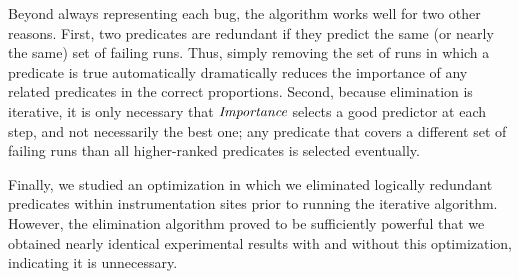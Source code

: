 Beyond always representing each bug, the algorithm works well for two
other reasons.  First, two predicates are redundant if they predict
the same (or nearly the same) set of failing runs.  Thus, simply
removing the set of runs in which a predicate is true automatically
dramatically reduces the importance of any related predicates in the
correct proportions. Second, because elimination is iterative, it is
only necessary that $\textit{Importance}$ selects a good predictor at each
step, and not necessarily the best one; any predicate that covers a
different set of failing runs than all higher-ranked predicates is
selected eventually.

Finally, we studied an optimization in which we eliminated logically redundant
predicates within instrumentation sites prior to running the iterative algorithm.
However, the elimination algorithm proved to be sufficiently powerful that
we obtained nearly identical experimental results with and without 
this optimization, indicating it is unnecessary. 

